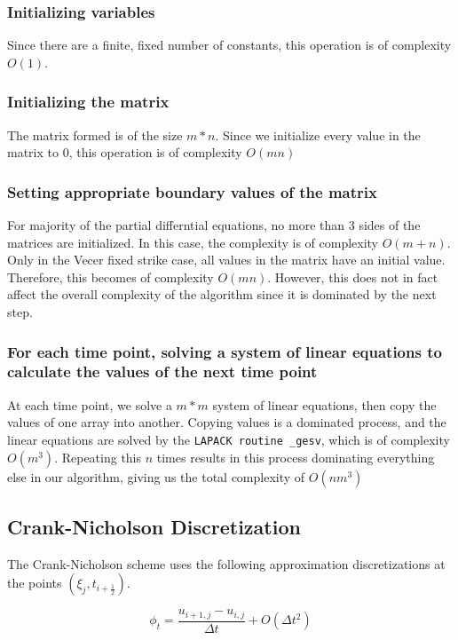 \documentclass{article}
\begin{document}
\subsubsection{Initializing variables}
Since there are a finite, fixed number of constants, this operation is of complexity \(O(1)\).
\subsubsection{Initializing the matrix}
The matrix formed is of the size \(m*n\). Since we initialize every value in the matrix to 0, this operation is of complexity \(O(mn)\)
\subsubsection{Setting appropriate boundary values of the matrix}
For majority of the partial differntial equations, no more than 3 sides of the matrices are initialized. In this case, the complexity is of complexity \(O(m+n)\). Only in the Vecer fixed strike case, all values in the matrix have an initial value. Therefore, this becomes of complexity \(O(mn)\). However, this does not in fact affect the overall complexity of the algorithm since it is dominated by the next step.
\subsubsection{For each time point, solving a system of linear equations to calculate the values of the next time point}
At each time point, we solve a \(m*m\) system of linear equations, then copy the values of one array into another. Copying values is a dominated process, and the linear equations are solved by the \texttt{LAPACK routine \_gesv}\cite{numpy_manual}, which is of complexity \(O(m^3)\). Repeating this \(n\) times results in this process dominating everything else in our algorithm, giving us the total complexity of \(O(nm^3)\)

\subsection{Crank-Nicholson Discretization}
The Crank-Nicholson scheme uses the following approximation discretizations at the points \((\xi_j, t_{i+\frac{1}{2}})\).

\begin{equation}
  \phi_t = \frac{u_{i+1, j} - u_{i, j}}{\Delta t} + O(\Delta t^2)
\end{equation}
\end{document}
